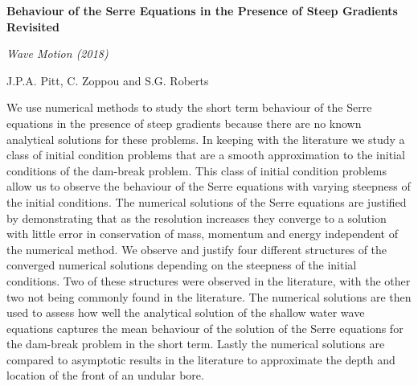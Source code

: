 \begin{center}
	\textbf{
		\Large Behaviour of the Serre Equations in the Presence of Steep
		Gradients Revisited}
	
	\vspace*{\baselineskip}
	
	\textit{Wave Motion (2018)}
	
	{J.P.A. Pitt, C. Zoppou and S.G. Roberts}
	\vspace*{0.5\baselineskip}
\end{center}
We use numerical methods to study the short term behaviour of the Serre equations in
the presence of steep gradients because there are no known analytical solutions for these
problems. In keeping with the literature we study a class of initial condition problems that
are a smooth approximation to the initial conditions of the dam-break problem. This class
of initial condition problems allow us to observe the behaviour of the Serre equations
with varying steepness of the initial conditions. The numerical solutions of the Serre
equations are justified by demonstrating that as the resolution increases they converge
to a solution with little error in conservation of mass, momentum and energy independent
of the numerical method. We observe and justify four different structures of the converged
numerical solutions depending on the steepness of the initial conditions. Two of these
structures were observed in the literature, with the other two not being commonly found
in the literature. The numerical solutions are then used to assess how well the analytical
solution of the shallow water wave equations captures the mean behaviour of the solution
of the Serre equations for the dam-break problem in the short term. Lastly the numerical
solutions are compared to asymptotic results in the literature to approximate the depth
and location of the front of an undular bore.


	